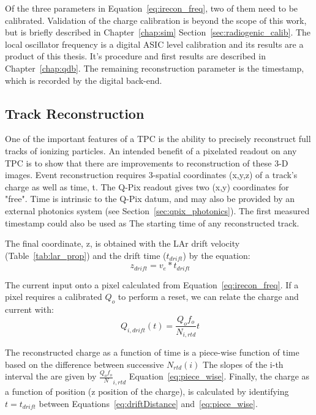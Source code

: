 Of the three parameters in Equation~\ref{eq:irecon_freq}, two of them need to be calibrated.
Validation of the charge calibration is beyond the scope of this work, but is briefly described in Chapter~\ref{chap:sim} Section~\ref{sec:radiogenic_calib}.
The local oscillator frequency is a digital ASIC level calibration and its results are a product of this thesis.
It's procedure and first results are described in Chapter~\ref{chap:qdb}.
The remaining reconstruction parameter is the timestamp, which is recorded by the digital back-end.

\subsection{Track Reconstruction}

One of the important features of a TPC is the ability to precisely reconstruct full tracks of ionizing particles.
An intended benefit of a pixelated readout on any TPC is to show that there are improvements to reconstruction of these 3-D images.
Event reconstruction requires 3-spatial coordinates (x,y,z) of a track's charge as well as time, t. 
The Q-Pix readout gives two (x,y) coordinates for "free".
Time is intrinsic to the Q-Pix datum, and may also be provided by an external photonics system (see Section~\ref{sec:qpix_photonics}).
The first measured timestamp could also be used as The starting time of any reconstructed track.

The final coordinate, z, is obtained with the LAr drift velocity (Table~\ref{tab:lar_prop}) and the drift time ($t_{drift}$) by the equation:
\begin{equation}~\label{eq:driftDistance}
  z_{drift} = v_{e} * t_{drift}
\end{equation}

The current input onto a pixel calculated from Equation~\ref{eq:irecon_freq}.
If a pixel requires a calibrated $Q_{o}$ to perform a reset, we can relate the charge and current with:
\begin{equation}~\label{eq:piece_wise}
  Q_{i,drift}(t) = \frac{Q_{o}f_{o}}{N_{i,rtd}}t
\end{equation}

The reconstructed charge as a function of time is a piece-wise function of time based on the difference between successive $N_{rtd}(i)$
The slopes of the i-th interval the are given by $\frac{Q_{o}f_{o}}N_{i,rtd}$ Equation~\ref{eq:piece_wise}.
Finally, the charge as a function of position (z position of the charge), is calculated by identifying $t = t_{drift}$ between Equations~\ref{eq:driftDistance} and~\ref{eq:piece_wise}.

